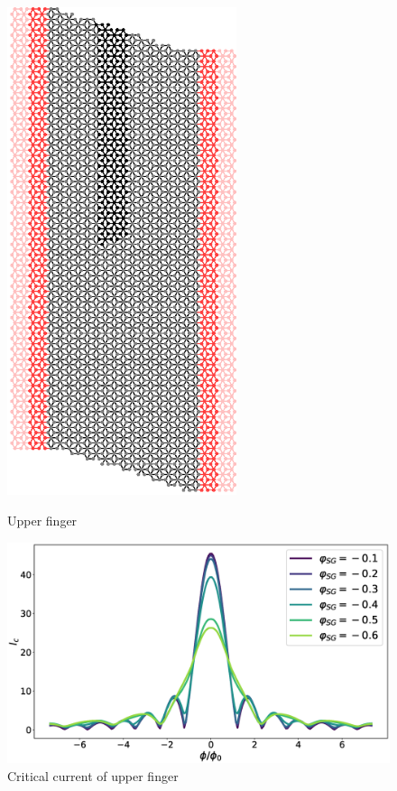 \documentclass[a4paper]{article}
\begin{document}
\begin{figure}
\centering
\begin{minipage}{0.3\textwidth}
\centering
\includegraphics[width=0.6\textwidth]{hb_upper}
\caption{Upper finger}
\end{minipage}%
\begin{minipage}{0.7\textwidth}
\centering
\includegraphics[width=\textwidth]{hb_upper_plot}
\caption{Critical current of upper finger}
\end{minipage}
\end{figure}
\end{document}
